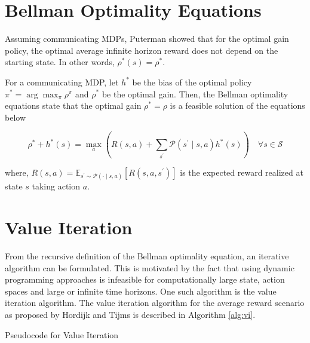 \section{Bellman Optimality Equations}

Assuming communicating MDPs, Puterman \cite{puterman_chapter_1990} showed that for the optimal gain policy, the optimal average infinite horizon reward does not depend on the starting state. In other words, $\rho^*(s) = \rho^*$.

For a communicating MDP, let $h^*$ be the bias of the optimal policy $\pi^* = \arg \max_\pi \rho^\pi$ and $\rho^*$ be the optimal gain. 
Then, the Bellman optimality equations state that the optimal gain $\rho^* = \rho$ is a feasible solution of the equations below 

\begin{equation}
    \rho^* + h^*(s) = \max_a \left( R(s, a) + \sum_{s^\prime} \mathcal{P}(s^\prime \mid s, a) h^*(s) \right) \quad \forall s \in \mathcal{S}
\end{equation}

where, $R(s,a) = \mathbb{E}_{s^\prime \sim \mathcal{P}(\cdot \mid s, a)}\left[ R(s, a, s^\prime) \right]$ is the expected reward realized at state $s$ taking action $a$.

\section{Value Iteration}

From the recursive definition of the Bellman optimality equation, an iterative algorithm can be formulated. 
This is motivated by the fact that using dynamic programming approaches is infeasible for computationally large state, action spaces and large or infinite time horizons.
One such algorithm is the value iteration algorithm. The value iteration algorithm for the average reward scenario as proposed by Hordijk and Tijms \cite{hordijk_modified_1975} is described in Algorithm \ref{alg:vi}.

\begin{algorithm}[!htbp]
    
    
    \BlankLine
    \BlankLine
    \caption{Pseudocode for Value Iteration}\label{alg:vi}
\end{algorithm}

